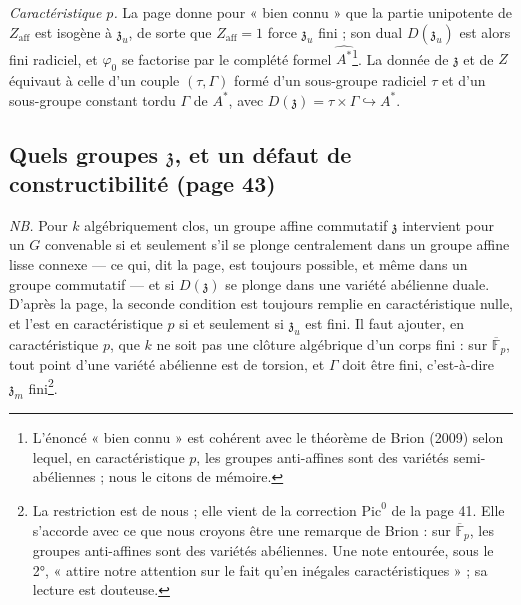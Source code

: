 \documentclass[11pt,a4paper]{article}
\begin{document}
\emph{Caractéristique $p$.} La page donne pour « bien connu » que la partie
unipotente de $Z_{\mathrm{aff}}$ est isogène à $\mathfrak{z}_u$, de sorte
que $Z_{\mathrm{aff}} = 1$ force $\mathfrak{z}_u$ fini ; son dual
$D(\mathfrak{z}_u)$ est alors fini radiciel, et $\varphi_0$ se factorise par
le complété formel $\widehat{A^{*}}$\footnote{L'énoncé « bien connu » est
cohérent avec le théorème de Brion (2009) selon lequel, en caractéristique
$p$, les groupes anti-affines sont des variétés semi-abéliennes ; nous le
citons de mémoire.}. La donnée de $\mathfrak{z}$ et de $Z$ équivaut à celle
d'un couple $(\tau, \Gamma)$ formé d'un sous-groupe radiciel $\tau$ et d'un
sous-groupe constant tordu $\Gamma$ de $A^{*}$, avec
$D(\mathfrak{z}) = \tau \times \Gamma \hookrightarrow A^{*}$.

\subsection*{Quels groupes $\mathfrak{z}$, et un défaut de constructibilité (page 43)}

\emph{NB.} Pour $k$ algébriquement clos, un groupe affine commutatif
$\mathfrak{z}$ intervient pour un $G$ convenable si et seulement s'il se
plonge centralement dans un groupe affine lisse connexe — ce qui, dit la
page, est toujours possible, et même dans un groupe commutatif — et si
$D(\mathfrak{z})$ se plonge dans une variété abélienne duale. D'après la
page, la seconde condition est toujours remplie en caractéristique nulle, et
l'est en caractéristique $p$ si et seulement si $\mathfrak{z}_u$ est fini. Il
faut ajouter, en caractéristique $p$, que $k$ ne soit pas une clôture
algébrique d'un corps fini : sur $\overline{\mathbb{F}}_p$, tout point d'une
variété abélienne est de torsion, et $\Gamma$ doit être fini, c'est-à-dire
$\mathfrak{z}_m$ fini\footnote{La restriction est de nous ; elle vient de
la correction $\mathrm{Pic}^{0}$ de la page 41. Elle s'accorde avec ce que
nous croyons être une remarque de Brion : sur $\overline{\mathbb{F}}_p$, les
groupes anti-affines sont des variétés abéliennes. Une note entourée, sous
le 2°, « attire notre attention sur le fait qu'en inégales caractéristiques » ; sa lecture est douteuse.}.
\end{document}
